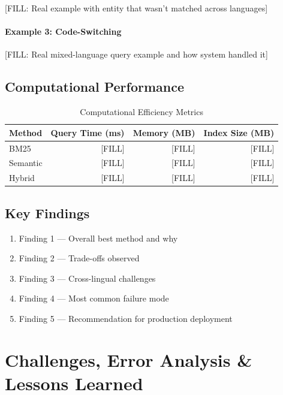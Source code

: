 \documentclass[12pt,a4paper]{report}
\begin{document}
[FILL: Real example with entity that wasn't matched across languages]

\subsubsection{Example 3: Code-Switching}

[FILL: Real mixed-language query example and how system handled it]

\section{Computational Performance}

\begin{table}[H]
    \centering
    \begin{tabular}{|l|r|r|r|}
        \hline
        \textbf{Method} & \textbf{Query Time (ms)} & \textbf{Memory (MB)} & \textbf{Index Size (MB)} \\
        \hline
        BM25 & [FILL] & [FILL] & [FILL] \\
        \hline
        Semantic & [FILL] & [FILL] & [FILL] \\
        \hline
        Hybrid & [FILL] & [FILL] & [FILL] \\
        \hline
    \end{tabular}
    \caption{Computational Efficiency Metrics}
\end{table}

\section{Key Findings}
\begin{center}
\begin{enumerate}
    \item Finding 1 --- Overall best method and why
    \item Finding 2 --- Trade-offs observed
    \item Finding 3 --- Cross-lingual challenges
    \item Finding 4 --- Most common failure mode
    \item Finding 5 --- Recommendation for production deployment
\end{enumerate}
\end{center}


\chapter{Challenges, Error Analysis \& Lessons Learned}
\end{document}
